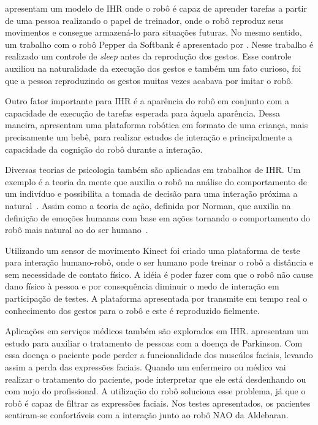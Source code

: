  apresentam um modelo de IHR onde o robô é capaz de aprender tarefas a partir de uma pessoa realizando o papel de treinador, onde o robô reproduz seus movimentos e consegue armazená-lo para situações futuras. No mesmo sentido, um trabalho com o robô Pepper da Softbank é apresentado por . Nesse trabalho é realizado um controle de \emph{sleep} antes da reprodução dos gestos. Esse controle auxiliou na naturalidade da execução dos gestos e também um fato curioso, foi que a pessoa reproduzindo os gestos muitas vezes acabava por imitar o robô.

Outro fator importante para IHR é a aparência do robô em conjunto com a capacidade de execução de tarefas esperada para àquela aparência. Dessa maneira,  apresentam uma plataforma robótica em formato de uma criança, mais precisamente um bebê, para realizar estudos de interação e principalmente a capacidade da cognição do robô durante a interação.

Diversas teorias de psicologia também são aplicadas em trabalhos de IHR. Um exemplo é a teoria da mente que auxilia o robô na análise do comportamento de um indivíduo e possibilita a tomada de decisão para uma interação próxima a natural~\cite{hiatt:2011}. Assim como a teoria de ação, definida por Norman, que auxilia na definição de emoções humanas com base em ações tornando o comportamento do robô mais natural ao do ser humano~\cite{toumi:2013}.

Utilizando um sensor de movimento Kinect foi criado uma plataforma de teste para interação humano-robô, onde o ser humano pode treinar o robô a distância e sem necessidade de contato físico. A idéia é poder fazer com que o robô não cause dano físico à pessoa e por consequência diminuir o medo de interação em participação de testes. A plataforma apresentada por  transmite em tempo real o conhecimento dos gestos para o robô e este é reproduzido fielmente.

Aplicações em serviços médicos também são explorados em IHR.  apresentam um estudo para auxiliar o tratamento de pessoas com a doença de Parkinson. Com essa doença o paciente pode perder a funcionalidade dos muscúlos faciais, levando assim a perda das expressões faciais. Quando um enfermeiro ou médico vai realizar o tratamento do paciente, pode interpretar que ele está desdenhando ou com nojo do profissional. A utilização do robô soluciona esse problema, já que o robô é capaz de filtrar as expressões faciais. Nos testes apresentados, os pacientes sentiram-se confortáveis com a interação junto ao robô NAO da Aldebaran.

